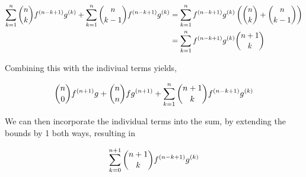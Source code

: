 \documentclass{article}
\begin{document}
\begin{align*}
  \sum \limits_{k=1}^n \binom{n}{k} f^{\left (n-k+1 \right)} g^{\left (k \right)} + \sum \limits_{k=1}^{n} \binom{n}{k-1} f^{\left (n-k+1 \right)} g^{\left (k \right)} &= \sum \limits_{k=1}^{n} f^{\left (n-k+1 \right)} g^{\left (k \right)} \left (\binom{n}{k} + \binom{n}{k-1} \right) \\
  &= \sum \limits_{k=1}^{n} f^{\left (n-k+1 \right)} g^{\left (k \right)} \binom{n+1}{k} \\
\end{align*}

Combining this with the indiviual terms yields,

$$
  \binom{n}{0} f^{\left (n+1 \right)} g + \binom{n}{n} f g^{\left (n+1 \right)} + \sum \limits_{k=1}^{n} \binom{n+1}{k} f^{\left (n-k+1 \right)} g^{\left (k \right)}
$$

We can then incorporate the individual terms into the sum, by extending the bounds by 1 both ways, resulting in

$$
\sum \limits_{k=0}^{n+1} \binom{n+1}{k} f^{\left (n-k+1 \right)} g^{\left (k \right)} 
$$
\end{document}

